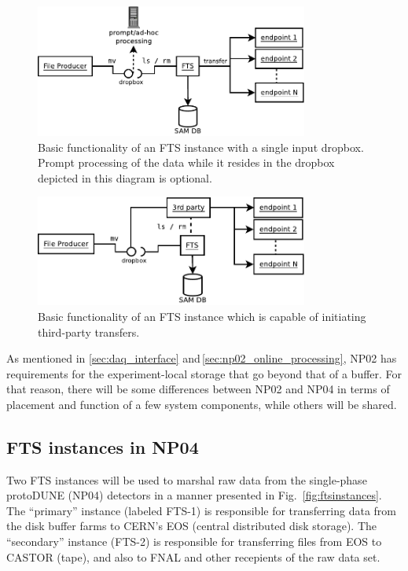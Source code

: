 \documentclass[12pt]{article}
\begin{document}
\begin{figure}[tbh]
  \centering
  \includegraphics[width=0.8\textwidth]{figures/fts-basics.pdf}
  \caption{Basic functionality of an FTS instance with a single input dropbox.
Prompt processing of the data while it resides in the dropbox depicted in this diagram is optional.}
  \label{fig:ftsbasics}
\end{figure}

\begin{figure}[tbh]
  \centering
  \includegraphics[width=0.8\textwidth]{figures/fts-basics-3rd.pdf}
  \caption{Basic functionality of an FTS instance which is capable of initiating third-party transfers.}
  \label{fig:ftsbasicsthird}
\end{figure}

\noindent As mentioned in \ref{sec:daq_interface} and\,\ref{sec:np02_online_processing},
NP02 has requirements for the experiment-local storage that go beyond
that of a buffer. For that reason, there will be some differences between
NP02 and NP04 in terms of placement and function of a few system components,
while others will be shared.

\subsection{FTS instances in NP04}
\label{sec:prim_sec}
Two FTS instances will be used to marshal raw data from the single-phase protoDUNE (NP04)
detectors in a manner presented in Fig.~\ref{fig:ftsinstances}.  The
``primary'' instance (labeled FTS-1) is responsible for transferring data
from the disk buffer farms to CERN's EOS (central distributed disk storage).
 The ``secondary'' instance (FTS-2) is responsible for transferring files from EOS to
CASTOR (tape), and also to FNAL and other recepients of the raw data set.
\end{document}
